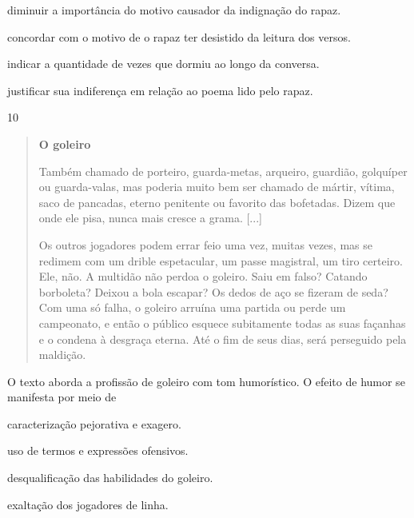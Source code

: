 \begin{escolha}
\item diminuir a importância do motivo causador da indignação do rapaz.

\item concordar com o motivo de o rapaz ter desistido da leitura dos
versos.

\item indicar a quantidade de vezes que dormiu ao longo da conversa.

\item justificar sua indiferença em relação ao poema lido pelo rapaz.
\end{escolha}

\num{10}

\begin{quote}
\textbf{O goleiro}

Também chamado de porteiro, guarda-metas, arqueiro, guardião, golquíper
ou guarda-valas, mas poderia muito bem ser chamado de mártir, vítima,
saco de pancadas, eterno penitente ou favorito das bofetadas. Dizem que
onde ele pisa, nunca mais cresce a grama. {[}...{]}

Os outros jogadores podem errar feio uma vez, muitas vezes, mas se
redimem com um drible espetacular, um passe magistral, um tiro certeiro.
Ele, não. A multidão não perdoa o goleiro. Saiu em falso? Catando
borboleta? Deixou a bola escapar? Os dedos de aço se fizeram de seda?
Com uma só falha, o goleiro arruína uma partida ou perde um campeonato,
e então o público esquece subitamente todas as suas façanhas e o condena
à desgraça eterna. Até o fim de seus dias, será perseguido pela
maldição.
\end{quote}


O texto aborda a profissão de goleiro com tom humorístico. O efeito de
humor se manifesta por meio de

\begin{escolha}
\item caracterização pejorativa e exagero.

\item uso de termos e expressões ofensivos.

\item desqualificação das habilidades do goleiro.

\item exaltação dos jogadores de linha.
\end{escolha}

